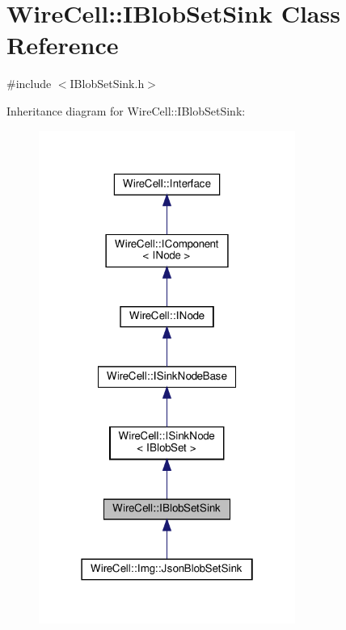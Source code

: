 \hypertarget{class_wire_cell_1_1_i_blob_set_sink}{}\section{Wire\+Cell\+:\+:I\+Blob\+Set\+Sink Class Reference}
\label{class_wire_cell_1_1_i_blob_set_sink}


{\ttfamily \#include $<$I\+Blob\+Set\+Sink.\+h$>$}



Inheritance diagram for Wire\+Cell\+:\+:I\+Blob\+Set\+Sink\+:
\nopagebreak
\begin{figure}[H]
\begin{center}
\leavevmode
\includegraphics[width=238pt]{class_wire_cell_1_1_i_blob_set_sink__inherit__graph}
\end{center}
\end{figure}


